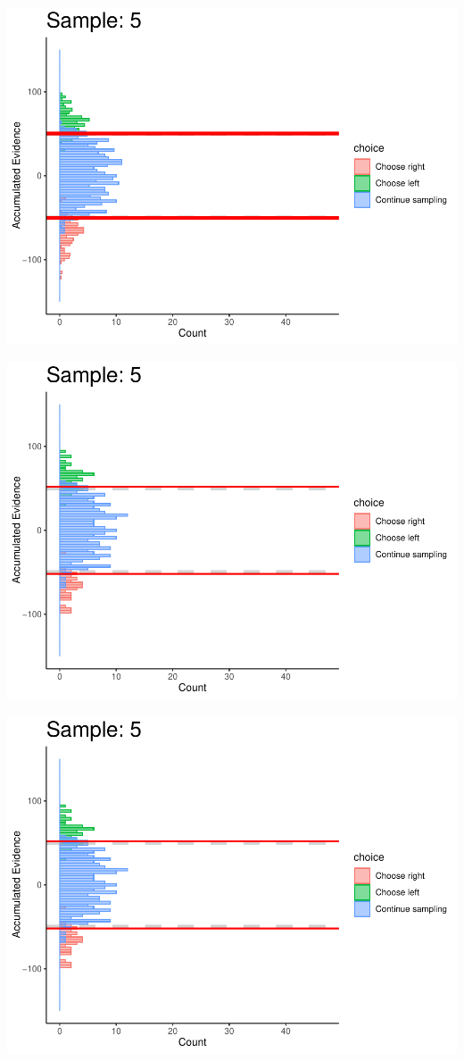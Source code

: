 \documentclass[
]{book}
\begin{document}
\begin{center}\includegraphics[width=0.8\linewidth]{LateNightBayes_files/figure-latex/fixed_dcb-40} \end{center}

\begin{center}\includegraphics[width=0.8\linewidth]{LateNightBayes_files/figure-latex/fixed_dcb-41} \end{center}

\begin{center}\includegraphics[width=0.8\linewidth]{LateNightBayes_files/figure-latex/fixed_dcb-42} \end{center}
\end{document}
